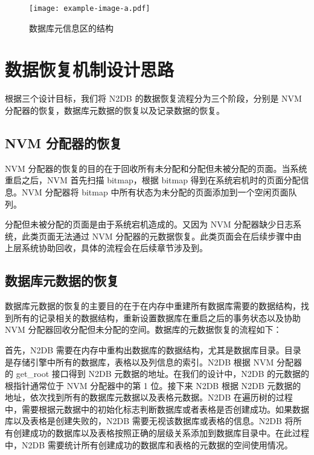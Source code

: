 \begin{figure}
    \centering
    \texttt{[image: example-image-a.pdf]}
    \caption{数据库元信息区的结构}
    \label{fig:catalog}
\end{figure}

\section{数据恢复机制设计思路}

根据三个设计目标，我们将 N2DB 的数据恢复流程分为三个阶段，分别是 NVM 分配器的恢复，数据库元数据的恢复以及记录数据的恢复。

\subsection{NVM 分配器的恢复}
\label{ssec:allocator-recovery}

NVM 分配器的恢复的目的在于回收所有未分配和分配但未被分配的页面。当系统重启之后，NVM 首先扫描 bitmap，根据 bitmap 得到在系统宕机时的页面分配信息。NVM 分配器将 bitmap 中所有状态为未分配的页面添加到一个空闲页面队列。

分配但未被分配的页面是由于系统宕机造成的。又因为 NVM 分配器缺少日志系统，此类页面无法通过 NVM 分配器的元数据恢复。此类页面会在后续步骤中由上层系统协助回收，具体的流程会在后续章节涉及到。


\subsection{数据库元数据的恢复}
\label{ssec:metadata-recovery}

数据库元数据的恢复的主要目的在于在内存中重建所有数据库需要的数据结构，找到所有的记录相关的数据结构，重新设置数据库在重启之后的事务状态以及协助 NVM 分配器回收分配但未分配的空间。数据库的元数据恢复的流程如下：

首先，N2DB 需要在内存中重构出数据库的数据结构，尤其是数据库目录。目录是存储引擎中所有的数据库，表格以及列信息的索引。N2DB 根据 NVM 分配器的 get\_root 接口得到 N2DB 元数据的地址。在我们的设计中，N2DB 的元数据的根指针通常位于 NVM 分配器中的第 1 位。接下来 N2DB 根据 N2DB 元数据的地址，依次找到所有的数据库元数据以及表格元数据。N2DB 在遍历树的过程中，需要根据元数据中的初始化标志判断数据库或者表格是否创建成功。如果数据库以及表格是创建失败的，N2DB 需要无视该数据库或表格的信息。N2DB 将所有创建成功的数据库以及表格按照正确的层级关系添加到数据库目录中。在此过程中，N2DB 需要统计所有创建成功的数据库和表格的元数据的空间使用情况。

